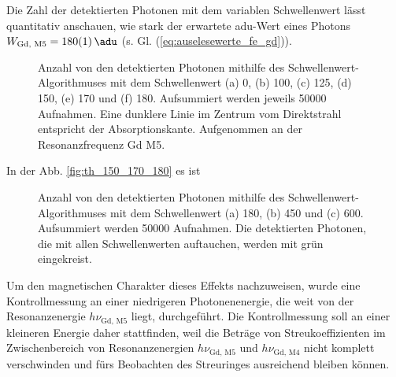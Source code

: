 Die Zahl der detektierten Photonen mit dem variablen Schwellenwert lässt quantitativ anschauen, wie stark der erwartete \gls{adu}-Wert eines Photons $W_\text{Gd, M5} =  \SI{180(1)}{\adu}$ (s. Gl. (\ref{eq:auselesewerte_fe_gd})).
\begin{figure}[H]
    \centering
    
    \caption{Anzahl von den detektierten Photonen mithilfe des Schwellenwert-Algorithmuses mit dem Schwellenwert (a) \SI{0}{\adu}, (b) \SI{100}{\adu}, (c) \SI{125}{\adu}, (d) \SI{150}{\adu}, (e) \SI{170}{\adu} und (f) \SI{180}{\adu}. Aufsummiert werden jeweils \num{50000} Aufnahmen. Eine dunklere Linie im Zentrum vom Direktstrahl entspricht der Absorptionskante. Aufgenommen an der Resonanzfrequenz Gd M5.}
    \label{fig:th_0_100_125_150_170_180}
\end{figure}




\noindent
In der Abb. \ref{fig:th_150_170_180} es ist 
%     
\begin{figure}[H]
    \centering
    
    \caption{Anzahl von den detektierten Photonen mithilfe des Schwellenwert-Algorithmuses mit dem Schwellenwert (a) \SI{180}{\adu}, (b) \SI{450}{\adu} und (c) \SI{600}{\adu}. Aufsummiert werden \num{50000} Aufnahmen. Die detektierten Photonen, die mit allen Schwellenwerten auftauchen, werden mit grün eingekreist. }
    \label{fig:th_180_450_600}
\end{figure}

\begin{figure}[H]
    \centering
    
    \caption{}
    \label{fig:th-150-200-maske-radial-transform}
\end{figure}
\begin{figure}[H]
    \centering
    
    \caption{}
    \label{fig:radius_fit}
\end{figure}

\noindent
Um den magnetischen Charakter dieses Effekts nachzuweisen, wurde eine Kontrollmessung an einer niedrigeren Photonenenergie, die weit von der Resonanzenergie $h\nu_{\text{Gd, M5}}$ liegt, durchgeführt. Die Kontrollmessung soll an einer kleineren Energie daher stattfinden, weil die Beträge von Streukoeffizienten im Zwischenbereich von Resonanzenergien $h\nu_{\text{Gd, M5}}$ und $h\nu_{\text{Gd, M4}}$ nicht komplett verschwinden und fürs Beobachten des Streuringes ausreichend bleiben können.

